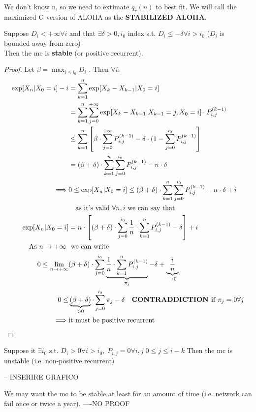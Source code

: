 We don't know n, so we need to extimate $q_r(n)$ to best fit. We will call the maximized G version
of ALOHA as the \textbf{STABILIZED ALOHA}.

\begin{lemma}
  Suppose $D_i < +\infty \forall i$ and that $\exists \delta > 0 , i_0$ index s.t.
  $D_i \le - \delta \forall i > i_0$ ($D_i$ is bounded away from zero)\\
  Then the  \gls{mc} is \textbf{stable} (or positive recurrent).
  \begin{proof}
    Let $\beta = \max_{i \le i_0} D_i$ . Then $\forall i$:
    \begin{equation}\begin{split}
      \exp[X_n | X_0 = i] -i &= \sum\limits_{k=1}^n \exp[X_k - X_{k-1}|X_0 = i] \\
      &= \sum\limits_{k=1}^n \sum\limits_{j=0}^{+\infty} \exp[X_k - X_{k-1}|X_{k-1} = j , X_0 = i ] \cdot P_{i,j}^{(k-1)}\\
      & \le \sum\limits_{k=1}^{n} \left[\beta \cdot \sum\limits_{j=0}^{+\infty} P_{i,j}^{(k-1)} - \delta \cdot (1- \sum\limits_{j=0}^{i_0} P_{i,j}^{(k-1)}\right]\\
       &= (\beta + \delta) \cdot \sum\limits_{k=1}^n \sum\limits_{j=0}^{i_0} P_{i,j}^{(k-1)} - n \cdot \delta \\
       \implies & 0 \le \exp[X_n | X_0 = i] \le (\beta + \delta) \cdot \sum\limits_{k=1}^n \sum\limits_{j=0}^{i_0} P_{i,j}^{(k-1)} - n \cdot \delta +i\\
       & \quad \text{as it's valid $\forall n , i$ we can say that} \\
       \exp[X_n | X_0 = i] &= n \cdot \left[(\beta + \delta) \cdot \sum\limits_{j=0}^{i_0} \frac{1}{n} \cdot \sum\limits_{k=1}^{n} P_{i,j}^{(k-1)} - \delta \right] +i\\
    \text{As $n \to +\infty$ } & \text{ we can write}\\
    0 \le \lim_{n \to +\infty} &(\beta + \delta) \cdot\sum\limits_{j=0}^{i_0} \underbrace {\frac{1}{n} \cdot \sum\limits_{k=1}^{n} P_{i,j}^{(k-1)}}_{\pi_j} - \delta + \underbrace{\frac{i}{n}}_{\to 0}\\
    0 \le &\underbrace{(\beta + \delta)}_{>0} \cdot \sum\limits_{j=0}^{i_0} \pi_j - \delta \quad \text{\textbf{CONTRADDICTION }if } \pi_j = 0 \forall j \\
    \implies & \text{it must be positive recurrent}
    \end{split}\end{equation}
  \end{proof}
\end{lemma}
\begin{lemma}
Suppose it $\exists i_0 \text{ s.t. } D_{i}>0 \forall i > i_0 , \; P_{i,j} = 0 \forall i,j \; 0 \le j \le i-k$
Then the \gls{mc} is unstable (i.e. non-positive recurrent)

-- INSERIRE GRAFICO

We may want the \gls{mc} to be stable at least for an amount of time (i.e. network can fail once or twice a year).
----NO PROOF
\end{lemma}

